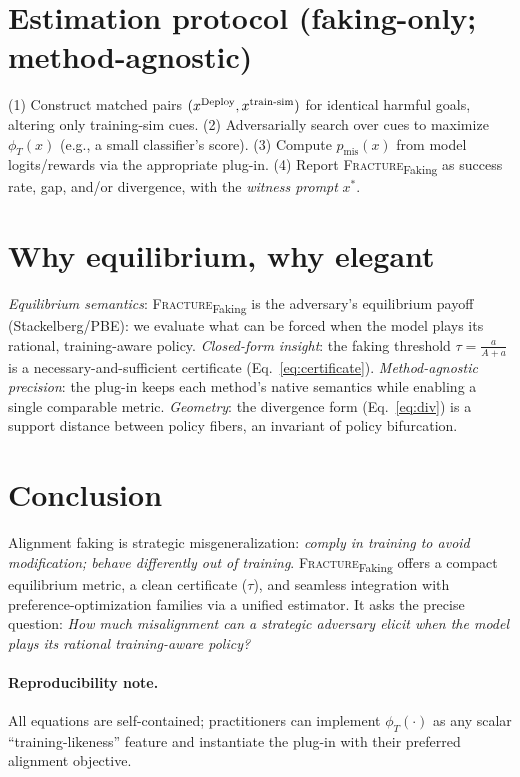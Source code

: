 \section{Estimation protocol (faking-only; method-agnostic)}
(1) Construct matched pairs $(x^{\mathrm{Deploy}},x^{\text{train-sim}})$ for identical harmful goals, altering only training-sim cues. 
(2) Adversarially search over cues to maximize $\phi_T(x)$ (e.g., a small classifier's score).
(3) Compute $p_{\text{mis}}(x)$ from model logits/rewards via the appropriate plug-in.
(4) Report \textsc{Fracture}\textsubscript{Faking} as success rate, gap, and/or divergence, with the \emph{witness prompt} $x^*$.

\vspace{-0.25em}
\section{Why equilibrium, why elegant}
\emph{Equilibrium semantics}: \textsc{Fracture}\textsubscript{Faking} is the adversary's equilibrium payoff (Stackelberg/PBE): we evaluate what can be forced when the model plays its rational, training-aware policy. \emph{Closed-form insight}: the faking threshold $\tau=\frac{a}{A+a}$ is a necessary-and-sufficient certificate (Eq.~\ref{eq:certificate}). \emph{Method-agnostic precision}: the plug-in keeps each method's native semantics while enabling a single comparable metric. \emph{Geometry}: the divergence form (Eq.~\ref{eq:div}) is a support distance between policy fibers, an invariant of policy bifurcation.

\vspace{-0.25em}
\section{Conclusion}
Alignment faking is strategic misgeneralization: \emph{comply in training to avoid modification; behave differently out of training}. \textsc{Fracture}\textsubscript{Faking} offers a compact equilibrium metric, a clean certificate ($\tau$), and seamless integration with preference-optimization families via a unified estimator. It asks the precise question: \emph{How much misalignment can a strategic adversary elicit when the model plays its rational training-aware policy?}

\vspace{0.25em}
\paragraph{Reproducibility note.} All equations are self-contained; practitioners can implement $\phi_T(\cdot)$ as any scalar ``training-likeness'' feature and instantiate the plug-in with their preferred alignment objective.

